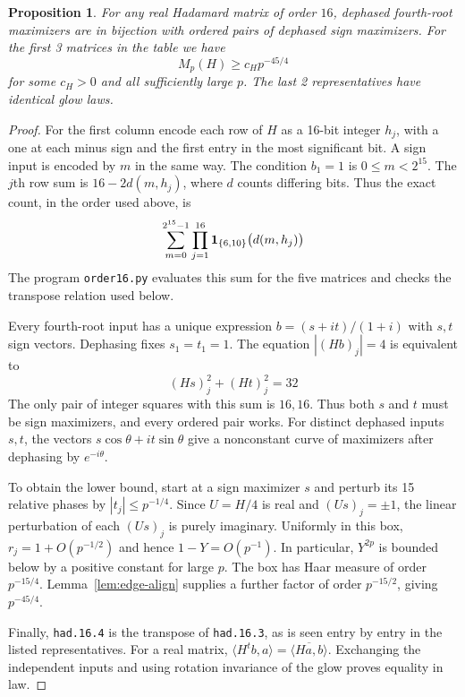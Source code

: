 \documentclass[11pt,a4paper]{article}
\newtheorem{prop}[thm]{Proposition}
\theoremstyle{remark}
\begin{document}
\begin{samepage}
\begin{prop}\label{prop:edge-sixteen}
For any real Hadamard matrix of order $16$, dephased fourth-root
maximizers are in bijection with ordered pairs of dephased sign
maximizers. For the first 3 matrices in the table we have
\[
 M_p(H)\ge c_H p^{-45/4}
\]
for some $c_H>0$ and all sufficiently large $p$. The last 2
representatives have identical glow laws.
\end{prop}
\end{samepage}
\begin{proof}
For the first column encode each row of $H$ as a 16-bit integer $h_j$,
with a one at each minus sign and the first entry in the most significant
bit. A sign input is encoded by $m$ in the same way. The condition $b_1=1$
is $0\le m<2^{15}$. The $j$th row sum is $16-2d(m,h_j)$, where $d$
counts differing bits. Thus the exact count, in the order used above, is
\[
 \sum_{m=0}^{2^{15}-1}\prod_{j=1}^{16}
 {\bf1}_{\{6,10\}}\big(d(m,h_j)\big)
\]
The program \texttt{order16.py} evaluates this sum for the five matrices and checks the transpose relation used below.

Every fourth-root input has a unique expression $b=(s+it)/(1+i)$
with $s,t$ sign vectors. Dephasing fixes $s_1=t_1=1$. The equation
$|(Hb)_j|=4$ is equivalent to
\[
 (Hs)_j^2+(Ht)_j^2=32
\]
The only pair of integer squares with this sum is $16,16$. Thus both
$s$ and $t$ must be sign maximizers, and every ordered pair works.
For distinct dephased inputs $s,t$, the vectors $s\cos\theta+it\sin\theta$
give a nonconstant curve of maximizers after dephasing by $e^{-i\theta}$.

To obtain the lower bound, start at a sign maximizer $s$ and perturb
its 15 relative phases by $|t_j|\le p^{-1/4}$. Since $U=H/4$ is real
and $(Us)_j=\pm1$, the linear perturbation of each $(Us)_j$ is purely
imaginary. Uniformly in this box, $r_j=1+O(p^{-1/2})$ and hence
$1-Y=O(p^{-1})$. In particular, $Y^{2p}$ is bounded below by a positive
constant for large $p$. The box has Haar measure of order $p^{-15/4}$.
Lemma~\ref{lem:edge-align} supplies a further factor of order $p^{-15/2}$,
giving $p^{-45/4}$.

Finally, \texttt{had.16.4} is the transpose of \texttt{had.16.3},
as is seen entry by entry in the listed representatives. For a real
matrix, $\langle H^t b,a\rangle=\overline{\langle Ha,b\rangle}$.
Exchanging the independent inputs and using rotation invariance of the
glow proves equality in law.
\end{proof}
\end{document}
